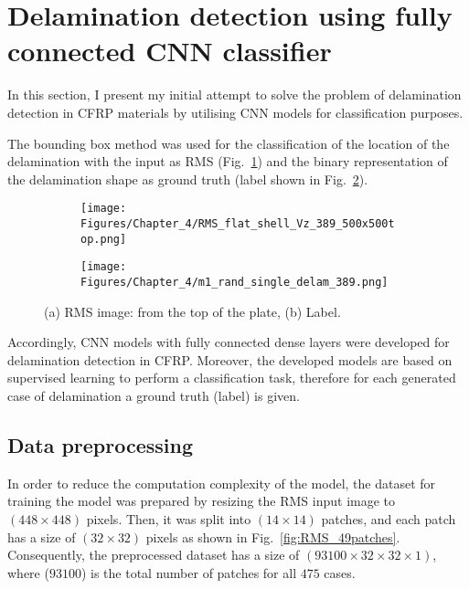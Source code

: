 \section{Delamination detection using fully connected CNN classifier}
\label{sec42}

In this section, I present my initial attempt to solve the problem of delamination detection in CFRP materials by utilising CNN models for classification purposes.

The bounding box method was used for the classification of the location of the delamina\-tion with the input as RMS (Fig.~\ref{fig:RMS_14}) and the binary representation of the delamination shape as ground truth (label shown in Fig.~\ref{fig:label_14}).
\begin{figure} [!ht]
	\centering
	\begin{subfigure}[b]{0.47\textwidth}
		\centering
		\texttt{[image: Figures/Chapter\_4/RMS\_flat\_shell\_Vz\_389\_500x500top.png]}
		\caption{}
		\label{fig:RMS_14}
	\end{subfigure}
	\hfill
	\begin{subfigure}[b]{0.47\textwidth}
		\centering
		\texttt{[image: Figures/Chapter\_4/m1\_rand\_single\_delam\_389.png]}
		\caption{}
		\label{fig:label_14}
	\end{subfigure}
	\caption{(a) RMS image: from the top of the plate, (b) Label.}
	\label{fig:RMS_GT}
\end{figure} 

Accordingly, CNN models with fully connected dense layers were developed for delamina\-tion detection in CFRP.
Moreover, the developed models are based on supervised learning to perform a classification task, therefore for each generated case of delamination a ground truth (label) is given.
 
\subsection{Data preprocessing}
\label{sec421}
In order to reduce the computation complexity of the model, the dataset for training the model was prepared by resizing the RMS input image to \((448\times 448)\) pixels.  
Then, it was split into \((14\times 14)\) patches, and each patch has a size of \((32\times 32)\) pixels as shown in Fig.~\ref{fig:RMS_49patches}.
Consequently, the preprocessed dataset has a size of \((93100\times 32\times 32 \times 1)\), where (\(93100\)) is the total number of patches for all \(475\) cases.

